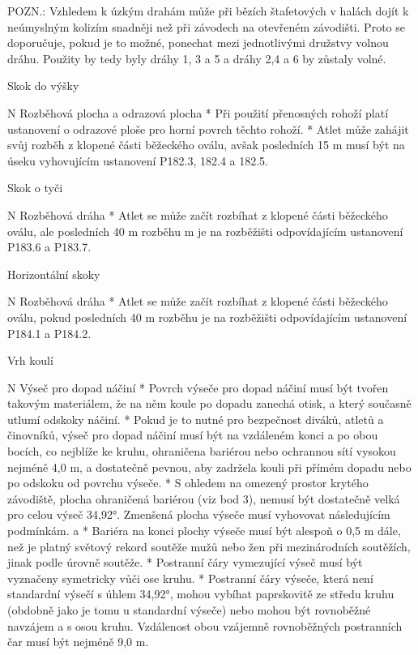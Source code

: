 POZN.: Vzhledem k úzkým drahám může při bězích štafetových v halách dojít k neúmyslným kolizím snadněji než při závodech na otevřeném závodišti. Proto se doporučuje, pokud je to možné, ponechat mezi jednotlivými družstvy volnou dráhu. Použity by tedy byly dráhy 1, 3 a 5 a dráhy 2,4 a 6 by zůstaly volné.
\enditems

\secc Skok do výšky

\begitems \style N
Rozběhová plocha a odrazová plocha
* Při použití přenosných rohoží platí ustanovení o odrazové ploše pro horní povrch těchto rohoží.
* Atlet může zahájit svůj rozběh z klopené části běžeckého oválu, avšak posledních 15 m musí být na úseku vyhovujícím ustanovení P182.3, 182.4 a 182.5.
\enditems

\secc Skok o tyči

\begitems \style N
Rozběhová dráha
* Atlet se může začít rozbíhat z klopené části běžeckého oválu, ale posledních 40 m rozběhu m je na rozběžišti odpovídajícím ustanovení P183.6 a P183.7.
\enditems

\secc Horizontální skoky

\begitems \style N
Rozběhová dráha
* Atlet se může začít rozbíhat z klopené části běžeckého oválu, pokud posledních 40 m rozběhu je na rozběžišti odpovídajícím ustanovení P184.1 a P184.2.
\enditems

\secc Vrh koulí

\begitems \style N
Výseč pro dopad náčiní
* Povrch výseče pro dopad náčiní musí být tvořen takovým materiálem, že na něm koule po dopadu zanechá otisk, a který současně utlumí odskoky náčiní.
* Pokud je to nutné pro bezpečnost diváků, atletů a činovníků, výseč pro dopad náčiní musí být na vzdáleném konci a po obou bocích, co nejblíže ke kruhu, ohraničena bariérou nebo ochrannou sítí vysokou nejméně 4,0 m, a dostatečně pevnou, aby zadržela kouli při přímém dopadu nebo po odskoku od povrchu výseče.
* S ohledem na omezený prostor krytého závodiště, plocha ohraničená bariérou (viz bod 3), nemusí být dostatečně velká pro celou výseč 34,92°. Zmenšená plocha výseče musí vyhovovat následujícím podmínkám.
  \begitems \style a
  * Bariéra na konci plochy výseče musí být alespoň o 0,5 m dále, než je platný světový rekord soutěže mužů nebo žen při mezinárodních soutěžích, jinak podle úrovně soutěže.
  * Postranní čáry vymezující výseč musí být vyznačeny symetricky vůči ose kruhu.
  * Postranní čáry výseče, která není standardní výsečí s úhlem 34,92°, mohou vybíhat paprskovitě ze středu kruhu (obdobně jako je tomu u standardní výseče) nebo mohou být rovnoběžné navzájem a s osou kruhu. Vzdálenost obou vzájemně rovnoběžných postranních čar musí být nejméně 9,0 m.
  \enditems

